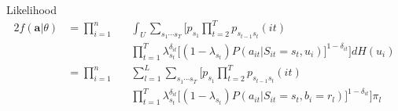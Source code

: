 \documentclass{beamer}
\begin{document}

\iffalse
\begin{frame}{Likelihood}
\begin{align*}
f(\textbf{a}|\theta) = \prod_{i=1}^n \int_U \sum_{{s_1}\cdots{s_T}} \biggr[ p_{s_1} \prod_{t=2}^T p_{s_{t-1}s_t}(it) \prod_{t=1}^T \lambda_{s_t}^{\delta_{it}} \big[(1-\lambda_{s_t})P(a_{it}|S_{it}=s_t,u_i)\big]^{1-\delta_{it}}\biggr] dH(u_i)

f(\textbf{a}|\theta) &= \prod_{i=1}^n\int_U\sum_{{s_1}\cdots{s_T}} \biggr[ P(s_{1})\prod_{t=2}^TP(s_{t}|s_{t-1}) \times \prod_{t=1}^T P(a_{it}|s_{t},u_i) \biggr] dH(u_i) \\
\bigskip
&= \prod_{i=1}^n\sum_{l=1}^L\sum_{{s_1}\cdots{s_T}} \biggr[ P(s_{1})\prod_{t=2}^TP(s_{t}|s_{t-1}) \times \prod_{t=1}^T P(a_{it}|s_{t},b_l) \biggr] \pi_l\\
\end{align*}
\end{frame}
\fi


\begin{frame}{Likelihood}
\begin{alignat*}{2}
f(\textbf{a}|\theta) & = \prod_{i=1}^n && \int_U \sum_{{s_1}\cdots{s_T}} \biggr[ p_{s_1} \prod_{t=2}^T p_{s_{t-1}s_t}(it) \\ 
& && \prod_{t=1}^T \lambda_{s_t}^{\delta_{it}} \big[(1-\lambda_{s_t})P(a_{it}|S_{it}=s_t,u_i)\big]^{1-\delta_{it}}\biggr] dH(u_i)\\
&= \prod_{i=1}^n && \sum_{l=1}^L \sum_{{s_1}\cdots{s_T}}\biggr[ p_{s_1} \prod_{t=2}^T p_{s_{t-1}s_t}(it)\\
& && \prod_{t=1}^T \lambda_{s_t}^{\delta_{it}} \big[(1-\lambda_{s_t})P(a_{it}|S_{it}=s_t,b_i=r_l)\big]^{1-\delta_{it}} \biggr] \pi_l\\
\end{alignat*}
\end{frame}






\end{document}
